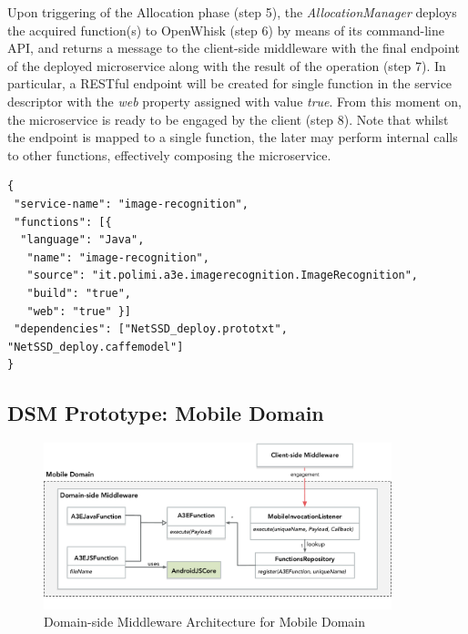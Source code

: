 Upon triggering of the Allocation phase (step 5), the \textit{AllocationManager} deploys the acquired function(s) to OpenWhisk (step 6) by means of its command-line API, and returns a message to the client-side middleware with the final endpoint of the deployed microservice along with the result of the operation (step 7). In particular, a RESTful endpoint will be created for single function in the service descriptor with the \textit{web} property assigned with value \textit{true}. From this moment on, the microservice is ready to be engaged by the client (step 8). Note that whilst the endpoint is mapped to a single function, the later may perform internal calls to other functions, effectively composing the microservice.



\begin{minipage}{.9\linewidth}
\begin{lstlisting}[caption=Image recognition service descriptor, label=lst:service-descriptor, captionpos=t]
{
 "service-name": "image-recognition",
 "functions": [{	
  "language": "Java",
   "name": "image-recognition",
   "source": "it.polimi.a3e.imagerecognition.ImageRecognition",
   "build": "true",
   "web": "true" }]
 "dependencies": ["NetSSD_deploy.prototxt", "NetSSD_deploy.caffemodel"]
}
\end{lstlisting}
\end{minipage}

\subsection{DSM Prototype: Mobile Domain}

\begin{figure}[tbp]
	\includegraphics[width=0.9\textwidth]{figs/a3e-mobiledomain-prototype}
	\caption{Domain-side Middleware Architecture for Mobile Domain}
	\label{fig:mobile-domain-prototype}
\end{figure}

